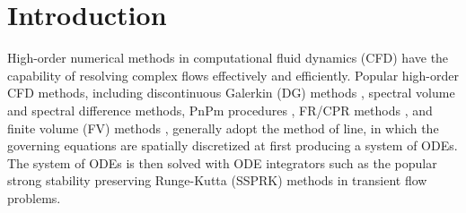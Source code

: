 
\section{Introduction}
\label{sec:intro}

High-order numerical methods in computational fluid dynamics (CFD)
have the capability of
resolving complex flows effectively and efficiently.
Popular high-order CFD methods, including discontinuous
Galerkin (DG) methods
\cite{reed1973triangularDG,
    BASSI1997251DG,
    BASSI1997267DG,
    cockburn1989DGII,
    cockburn2001rungeDG},
spectral volume
\cite{WANG2002210_SV}
and spectral difference
\cite{LIU2006780_SD} methods,
PnPm procedures
\cite{DUMBSER20088209_PNPM},
FR/CPR methods
\cite{huynh2007flux_FR,
    huynh2009reconstruction_FR,
    vincent2011new_FR,
    wang2009unifying_CPR},
and finite volume (FV) methods
\cite{wang2016compact_VR,
    wang2016compact1_VR,
    wang2017compact_VR,
    pan2018high_VR,
    zhang2019compact_VR,
    barth1990higher_FV,
    delanaye1999quadratic_FV,
    ollivier1997quasi_ENO,
    friedrich1998weighted_WENO,
    hu1999weighted_WENO,
    dumbser2007quadrature_WENO},
generally adopt the method of line,
in which the governing equations 
are spatially discretized at first
producing a system of ODEs.
The system of ODEs is then 
solved with
ODE integrators such as the 
popular strong stability preserving
Runge-Kutta (SSPRK) methods
\cite{gottlieb2001strong_SSPRK} in transient flow problems.

